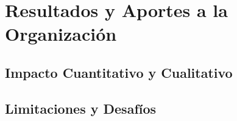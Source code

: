 \chapter{Resultados y Aportes a la Organización}
\label{cp:results}

\section{Impacto Cuantitativo y Cualitativo}

\section{Limitaciones y Desafíos}
